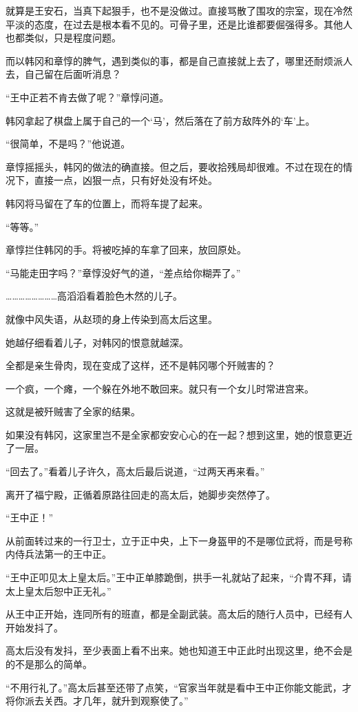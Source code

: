 就算是王安石，当真下起狠手，也不是没做过。直接骂散了围攻的宗室，现在冷然平淡的态度，在过去是根本看不见的。可骨子里，还是比谁都要倔强得多。其他人也都类似，只是程度问题。

而以韩冈和章惇的脾气，遇到类似的事，都是自己直接就上去了，哪里还耐烦派人去，自己留在后面听消息？

“王中正若不肯去做了呢？”章惇问道。

韩冈拿起了棋盘上属于自己的一个‘马’，然后落在了前方敌阵外的‘车’上。

“很简单，不是吗？”他说道。

章惇摇摇头，韩冈的做法的确直接。但之后，要收拾残局却很难。不过在现在的情况下，直接一点，凶狠一点，只有好处没有坏处。

韩冈将马留在了车的位置上，而将车提了起来。

“等等。”

章惇拦住韩冈的手。将被吃掉的车拿了回来，放回原处。

“马能走田字吗？”章惇没好气的道，“差点给你糊弄了。”

……………………高滔滔看着脸色木然的儿子。

就像中风失语，从赵顼的身上传染到高太后这里。

她越仔细看着儿子，对韩冈的恨意就越深。

全都是亲生骨肉，现在变成了这样，还不是韩冈哪个歼贼害的？

一个疯，一个瘫，一个躲在外地不敢回来。就只有一个女儿时常进宫来。

这就是被歼贼害了全家的结果。

如果没有韩冈，这家里岂不是全家都安安心心的在一起？想到这里，她的恨意更近了一层。

“回去了。”看着儿子许久，高太后最后说道，“过两天再来看。”

离开了福宁殿，正循着原路往回走的高太后，她脚步突然停了。

“王中正！”

从前面转过来的一行卫士，立于正中央，上下一身盔甲的不是哪位武将，而是号称内侍兵法第一的王中正。

“王中正叩见太上皇太后。”王中正单膝跪倒，拱手一礼就站了起来，“介胄不拜，请太上皇太后恕中正无礼。”

从王中正开始，连同所有的班直，都是全副武装。高太后的随行人员中，已经有人开始发抖了。

高太后没有发抖，至少表面上看不出来。她也知道王中正此时出现这里，绝不会是的不是那么的简单。

“不用行礼了。”高太后甚至还带了点笑，“官家当年就是看中王中正你能文能武，才将你派去关西。才几年，就升到观察使了。”

